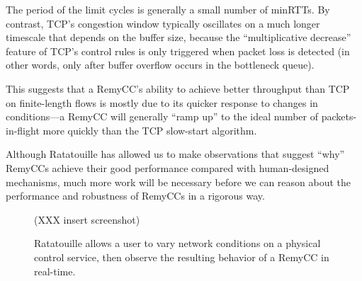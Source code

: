 The period of the limit cycles is generally a small number of
minRTTs. By contrast, TCP's congestion window typically oscillates on
a much longer timescale that depends on the buffer size, because the
``multiplicative decrease'' feature of TCP's control rules is only
triggered when packet loss is detected (in other words, only after
buffer overflow occurs in the bottleneck queue).

This suggests that a RemyCC's ability to achieve better throughput
than TCP on finite-length flows is mostly due to its quicker response
to changes in conditions---a RemyCC will generally ``ramp up'' to the
ideal number of packets-in-flight more quickly than the TCP
slow-start algorithm.

Although Ratatouille has allowed us to make observations that suggest
``why'' RemyCCs achieve their good performance compared with
human-designed mechanisms, much more work will be necessary before we
can reason about the performance and robustness of RemyCCs in a
rigorous way.

\begin{figure}
\caption{Ratatouille allows a user to vary network conditions on a
  physical control service, then observe the resulting behavior of a
  RemyCC in real-time.}
\label{fig:ratscreen}

\begin{center}

(XXX insert screenshot)

\end{center}
\end{figure}
